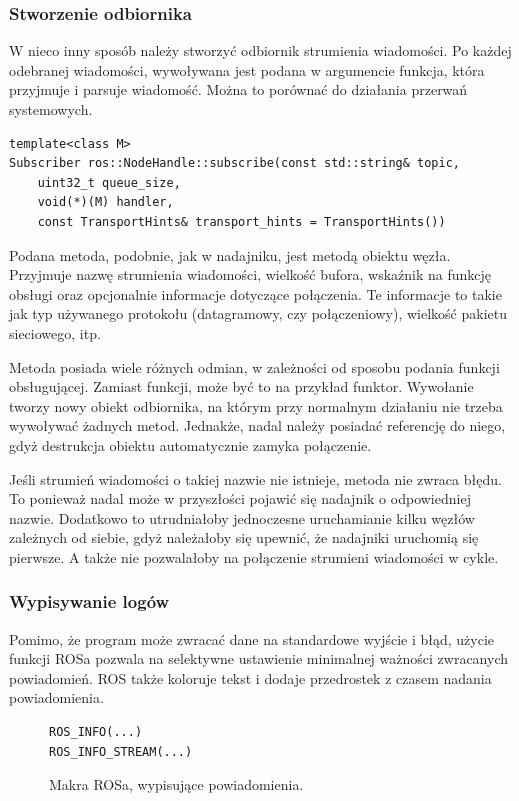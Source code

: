 		\subsubsection{Stworzenie odbiornika}
			W nieco inny sposób należy stworzyć odbiornik strumienia wiadomości.
			Po każdej odebranej wiadomości, wywoływana jest podana w argumencie funkcja, która przyjmuje i parsuje wiadomość.
			Można to porównać do działania przerwań systemowych.
			\begin{verbatim}
template<class M>
Subscriber ros::NodeHandle::subscribe(const std::string& topic,
	uint32_t queue_size,
	void(*)(M) handler,
	const TransportHints& transport_hints = TransportHints())
			\end{verbatim}
			Podana metoda, podobnie, jak w nadajniku, jest metodą obiektu węzła.
			Przyjmuje nazwę strumienia wiadomości, wielkość bufora, wskaźnik na funkcję obsługi oraz opcjonalnie informacje dotyczące połączenia.
			Te informacje to takie jak typ używanego protokołu (datagramowy, czy połączeniowy), wielkość pakietu sieciowego, itp.
			
			Metoda posiada wiele różnych odmian, w zależności od sposobu podania funkcji obsługującej. Zamiast funkcji, może być to na przykład funktor.
			Wywołanie tworzy nowy obiekt odbiornika, na którym przy normalnym działaniu nie trzeba wywoływać żadnych metod.
			Jednakże, nadal należy posiadać referencję do niego, gdyż destrukcja obiektu automatycznie zamyka połączenie.
			
			Jeśli strumień wiadomości o takiej nazwie nie istnieje, metoda nie zwraca błędu. To ponieważ nadal może w przyszłości pojawić się
			nadajnik o odpowiedniej nazwie. Dodatkowo to utrudniałoby jednoczesne uruchamianie kilku węzłów zależnych od siebie, gdyż należałoby się upewnić, że
			nadajniki uruchomią się pierwsze. A także nie pozwalałoby na połączenie strumieni wiadomości w cykle.
			
		\subsubsection{Wypisywanie logów}
			Pomimo, że program może zwracać dane na standardowe wyjście i błąd, użycie funkcji ROSa pozwala na selektywne ustawienie minimalnej ważności zwracanych powiadomień.
			ROS także koloruje tekst i dodaje przedrostek z czasem nadania powiadomienia.
			
			\begin{figure}[h]
			\begin{verbatim}
ROS_INFO(...)
ROS_INFO_STREAM(...)
			\end{verbatim}
			\caption{Makra ROSa, wypisujące powiadomienia.}
			\label{code:ros_logging}
			\end{figure}
			
